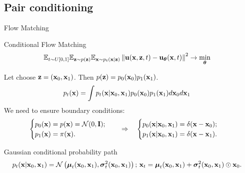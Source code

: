 \subsection{Pair conditioning}
\begin{frame}{Flow Matching}
	\begin{block}{Conditional Flow Matching}
		\vspace{-0.3cm}
		\[
			\mathbb{E}_{t \sim U[0, 1]} \mathbb{E}_{\mathbf{z} \sim p(\mathbf{z})} \mathbb{E}_{\mathbf{x} \sim p_t(\mathbf{x} | \mathbf{z})}\left\| \mathbf{u}(\mathbf{x}, \mathbf{z}, t) - \mathbf{u}_{\boldsymbol{\theta}}(\mathbf{x}, t) \right\|^2 \rightarrow \min_{\boldsymbol{\theta}}
		\]
		\vspace{-0.3cm}
	\end{block}
	Let choose $\mathbf{z} = (\mathbf{x}_0, \mathbf{x}_1)$. Then $p(\mathbf{z}) = p_0(\mathbf{x}_0) p_1(\mathbf{x}_1)$.
	\[
		p_t(\mathbf{x}) = \int p_t(\mathbf{x} | \mathbf{x}_0, \mathbf{x}_1) p_0(\mathbf{x}_0) p_1(\mathbf{x}_1) d \mathbf{x}_0 d \mathbf{x}_1
	\]
	We need to ensure boundary conditions:
	\[
		\begin{cases}
			p_0(\mathbf{x}) = p(\mathbf{x})= \mathcal{N}(0, \mathbf{I}); \\
			p_1(\mathbf{x}) = \pi(\mathbf{x}).
		\end{cases}
		\quad \Rightarrow \quad 
		\begin{cases}
			p_0(\mathbf{x} | \mathbf{x}_0, \mathbf{x}_1) = \delta(\mathbf{x} - \mathbf{x}_0); \\
			p_1(\mathbf{x} | \mathbf{x}_0, \mathbf{x}_1) = \delta(\mathbf{x} - \mathbf{x}_1).
		\end{cases}
	\]
	\vspace{-0.3cm}
	\begin{block}{Gaussian conditional probability path}
		\vspace{-0.4cm}
		\[
			p_t(\mathbf{x} | \mathbf{x}_0, \mathbf{x}_1) = \mathcal{N}\left(\boldsymbol{\mu}_t(\mathbf{x}_0, \mathbf{x}_1), \boldsymbol{\sigma}_t^2(\mathbf{x}_0, \mathbf{x}_1)\right); \, \mathbf{x}_t = \boldsymbol{\mu}_t(\mathbf{x}_0, \mathbf{x}_1) +  \boldsymbol{\sigma}_t^2(\mathbf{x}_0, \mathbf{x}_1) \odot \mathbf{x}_0.
		\]
		\vspace{-0.6cm}
	\end{block}
\end{frame}
